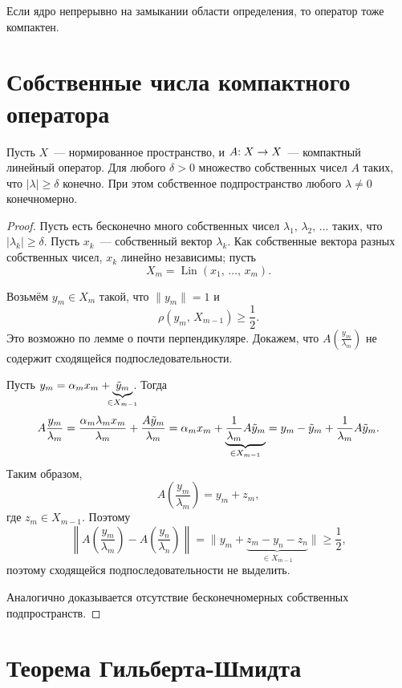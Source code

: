 \documentclass{notes}
\DeclareMathOperator{\Lin}{Lin}
\begin{document}
	\begin{exm}
		Если ядро непрерывно на замыкании области определения, то оператор тоже компактен.
	\end{exm}

\section{Собственные числа компактного оператора}

	\begin{thm}
		Пусть $X$~--- нормированное пространство, и $A \text{\text{:}} \; X \to X$~--- компактный линейный оператор. Для любого $\delta > 0$ множество собственных чисел $A$ таких, что $|\lambda| \geqslant \delta$ конечно. При этом собственное подпространство любого $\lambda \neq 0$ конечномерно.
		\begin{proof}
			Пусть есть бесконечно много собственных чисел $\lambda_1, \, \lambda_2, \, \ldots$ таких, что $|\lambda_k| \geqslant \delta$. Пусть $x_k$~--- собственный вектор $\lambda_k$. Как собственные вектора разных собственных чисел, $x_k$ линейно независимы; пусть
			\[
				X_m = \Lin(x_1, \, \ldots, \, x_m).
			\]

			Возьмём $y_m \in X_m$ такой, что $\|y_m\| = 1$ и 
			\[
				\rho(y_m, \, X_{m - 1}) \geqslant \dfrac{1}{2}.
			\]
			Это возможно по лемме о почти перпендикуляре. Докажем, что $A\left(\tfrac{y_m}{\lambda_m}\right)$ не содержит сходящейся подпоследовательности. 

			Пусть $y_m = \alpha_m x_m + \underbrace{\tilde{y}_m}_{\mathclap{\in X_{m - 1}}}$. Тогда
			\[
				A \dfrac{y_m}{\lambda_m} = \dfrac{\alpha_m \lambda_m x_m}{\lambda_m} + \dfrac{A \tilde{y}_m}{\lambda_m} = \alpha_m x_m + \underbrace{\dfrac{1}{\lambda_m} A \tilde{y}_m}_{\mathclap{\in X_{m-1}}} = y_m - \tilde{y}_m + \dfrac{1}{\lambda_m} A \tilde{y}_m.
			\]
			Таким образом, 
			\[
				A\left(\dfrac{y_m}{\lambda_m}\right) = y_m + z_m,
			\]
			где $z_m \in X_{m - 1}$. Поэтому
			\[
				\left\|A\left(\dfrac{y_m}{\lambda_m}\right) - A\left(\dfrac{y_n}{\lambda_n}\right)\right\| = \|y_m + \underbrace{z_m - y_n - z_n}_{\in X_{m - 1}}\| \geqslant \dfrac{1}{2},
			\]
			поэтому сходящейся подпоследовательности не выделить.

			Аналогично доказывается отсутствие бесконечномерных собственных подпространств.
		\end{proof}
	\end{thm}

\section{Теорема Гильберта-Шмидта}
\end{document}
